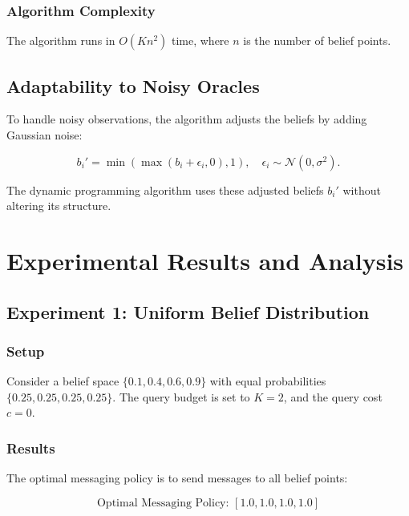 \documentclass[12pt]{article}
\begin{document}
\subsubsection{Algorithm Complexity}

The algorithm runs in \( O(Kn^2) \) time, where \( n \) is the number of belief points.

\subsection{Adaptability to Noisy Oracles}

To handle noisy observations, the algorithm adjusts the beliefs by adding Gaussian noise:

\begin{equation}
b_i' = \min\left( \max\left( b_i + \epsilon_i, 0 \right), 1 \right), \quad \epsilon_i \sim \mathcal{N}(0, \sigma^2).
\end{equation}

The dynamic programming algorithm uses these adjusted beliefs \( b_i' \) without altering its structure.

\section{Experimental Results and Analysis}

\subsection{Experiment 1: Uniform Belief Distribution}

\subsubsection{Setup}

Consider a belief space \( \{0.1, 0.4, 0.6, 0.9\} \) with equal probabilities \( \{0.25, 0.25, 0.25, 0.25\} \). The query budget is set to \( K = 2 \), and the query cost \( c = 0 \).

\subsubsection{Results}

The optimal messaging policy is to send messages to all belief points:

\begin{equation}
\text{Optimal Messaging Policy: } [1.0, 1.0, 1.0, 1.0]
\end{equation}
\end{document}
